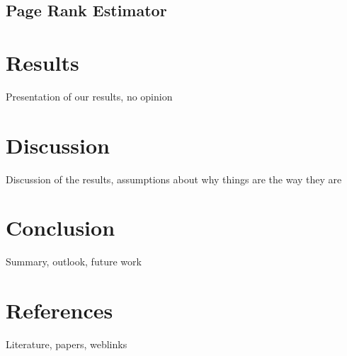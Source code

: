 \documentclass{article}
\begin{document}
\subsection{Page Rank Estimator}
\section{Results}
Presentation of our results, no opinion

\section{Discussion}
Discussion of the results, assumptions about why things are the way they are

\section{Conclusion}
Summary, outlook, future work

\section{References}
Literature, papers, weblinks
\printbibliography
\end{document}
